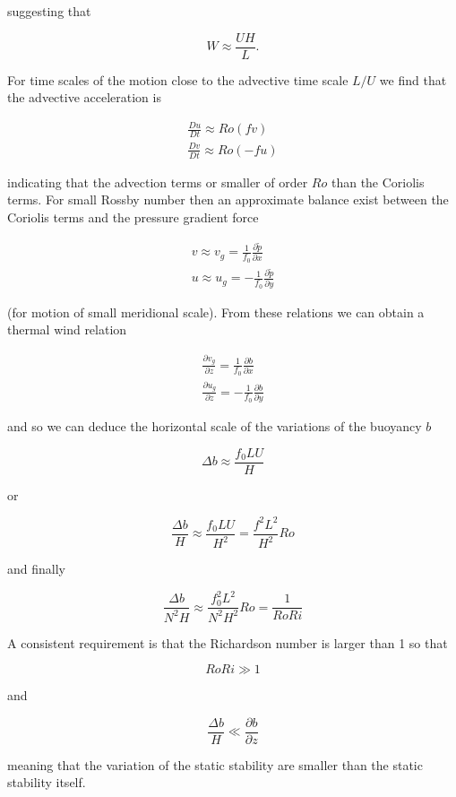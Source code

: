 suggesting that

\[W \approx \frac{U H}{L}.\]

For time scales of the motion close to the advective time scale \(L/U\)
we find that the advective acceleration is

\[\begin{aligned}
\frac{D u}{Dt} \approx Ro (f v)\\
\frac{D v}{Dt} \approx Ro (- f u)
\end{aligned}\]

indicating that the advection terms or smaller of order \(Ro\) than the
Coriolis terms. For small Rossby number then an approximate balance
exist between the Coriolis terms and the pressure gradient force

\[\begin{aligned}
v \approx v_g =  \frac{1}{f_0}\frac{\partial \tilde{p}}{\partial x}\\
u \approx u_g = -\frac{1}{f_0}\frac{\partial \tilde{p}}{\partial y}
\end{aligned}\]

(for motion of small meridional scale). From these relations we can
obtain a thermal wind relation

\[\begin{aligned}
\frac{\partial v_g}{\partial z} =  \frac{1}{f_0}\frac{\partial b}{\partial x}\\
\frac{\partial u_g}{\partial z} = -\frac{1}{f_0}\frac{\partial b}{\partial y}
\end{aligned}\]

and so we can deduce the horizontal scale of the variations of the
buoyancy \(b\)

\[\Delta b \approx \frac{f_0 L U}{H}\]

or

\[\frac{\Delta b}{H} \approx \frac{f_0 L U}{H^2}= \frac{f^2L^2}{H^2} Ro\]

and finally

\[\frac{\Delta b}{N^2 H} \approx \frac{f_0^2L^2}{N^2H^2} Ro = \frac{1}{Ro Ri}\]

A consistent requirement is that the Richardson number is larger than
1 so that

{\[Ro Ri \gg 1\]}

and

\[\frac{\Delta b}{H} \ll \frac{\partial b}{\partial z}\]

meaning that the variation of the static stability are smaller than the
static stability itself.

